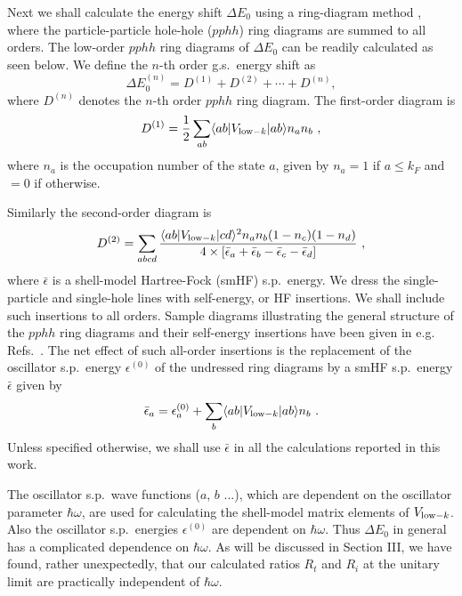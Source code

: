 \documentclass[twocolumn,preprintnumbers,superscriptaddress]{revtex4}
\begin{document}
Next we shall calculate
the energy shift $\Delta E_0$ using a ring-diagram method
\cite{Siu2008,pphh1,pphh2}, where the particle-particle hole-hole
($pphh$) ring diagrams are summed to all orders.
The low-order $pphh$ ring diagrams of $\Delta E_0$ can be readily
calculated  as seen below.
We define the $n$-th order g.s.~energy shift as
\begin{equation}
\Delta E_0^{(n)}= D^{(1)}+D^{(2)}+ \cdots  +D^{(n)},
\end{equation}
where $D^{(n)}$ denotes the $n$-th order $pphh$ ring diagram.
The first-order diagram is
\begin{equation}
D^{(1)} =  \frac{1}{2}\sum\limits_{ab} \langle ab|V_{{\rm low}-k}|ab
\rangle n_a n_b~,   \label{D1}
\end{equation}
where
$n_a$ is the occupation number of the state $a$,
given by $n_a=1$ if $a \leq k_F$ and $=0$ if otherwise.

Similarly the second-order diagram is
\begin{equation} D^{(2)}=
 \sum\limits_{abcd}
\frac{\langle ab|V_{{\rm low}-k}|cd \rangle^2 n_a n_b (1-n_c)(1-n_d)}
{4\times [\bar\epsilon_a + \bar \epsilon_b -\bar \epsilon_c -\bar \epsilon_d]}~,
  \label{D2}
\end{equation}
where $\bar\epsilon$ is a shell-model Hartree-Fock (smHF) s.p.~energy.
We dress the single-particle and single-hole lines
with self-energy, or HF insertions.
We shall include such insertions to all orders.
Sample diagrams illustrating the general structure
of the $pphh$ ring diagrams and their self-energy
insertions have been given
in e.g. Refs.~\cite{Siu2008,pphh1}.
The net effect of  such all-order insertions
is the replacement of the oscillator
s.p.~energy $\epsilon^{(0)}$ of the undressed ring diagrams
by a smHF s.p.~energy $\bar \epsilon$  given by
\begin{eqnarray}
\bar \epsilon_a= \epsilon ^{(0)}_a + \sum\limits_{b} \langle ab|V_{{\rm low}-k}|ab \rangle n_b~.
\end{eqnarray}
Unless specified otherwise, we shall use $\bar \epsilon$
in all the calculations reported in this work.

The oscillator s.p.~wave functions ($a$, $b$ ...), which are dependent
on the oscillator parameter $\hbar \omega$, are used for
calculating the shell-model matrix elements
of $V_{{\rm low}-k}$.  Also the oscillator s.p.~energies $\epsilon^{(0)}$ are dependent on $\hbar \omega$.
Thus $\Delta E_0$ in general has a complicated dependence on $\hbar \omega$.
As will be discussed in Section III, we have found,
rather unexpectedly, that our calculated ratios $R_t$ and $R_i$ at the unitary limit
are practically independent of $\hbar \omega$.
\end{document}
